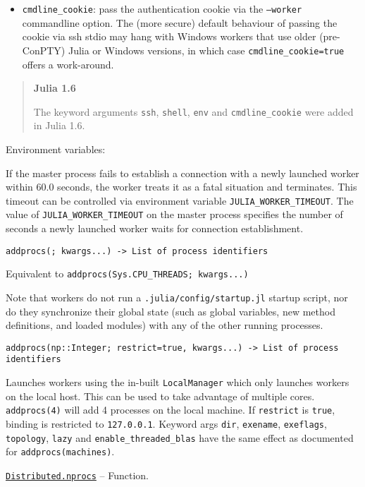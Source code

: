 \begin{adjustwidth}{2em}{0pt}
\begin{itemize}
\item \texttt{cmdline\_cookie}: pass the authentication cookie via the \texttt{--worker} commandline  option. The (more secure) default behaviour of passing the cookie via ssh stdio  may hang with Windows workers that use older (pre-ConPTY) Julia or Windows versions,  in which case \texttt{cmdline\_cookie=true} offers a work-around.

\end{itemize}
\begin{quote}
\textbf{Julia 1.6}

The keyword arguments \texttt{ssh}, \texttt{shell}, \texttt{env} and \texttt{cmdline\_cookie} were added in Julia 1.6.

\end{quote}
Environment variables:

If the master process fails to establish a connection with a newly launched worker within 60.0 seconds, the worker treats it as a fatal situation and terminates. This timeout can be controlled via environment variable \texttt{JULIA\_WORKER\_TIMEOUT}. The value of \texttt{JULIA\_WORKER\_TIMEOUT} on the master process specifies the number of seconds a newly launched worker waits for connection establishment.




\begin{lstlisting}
addprocs(; kwargs...) -> List of process identifiers
\end{lstlisting}

Equivalent to \texttt{addprocs(Sys.CPU\_THREADS; kwargs...)}

Note that workers do not run a \texttt{.julia/config/startup.jl} startup script, nor do they synchronize their global state (such as global variables, new method definitions, and loaded modules) with any of the other running processes.




\begin{lstlisting}
addprocs(np::Integer; restrict=true, kwargs...) -> List of process identifiers
\end{lstlisting}

Launches workers using the in-built \texttt{LocalManager} which only launches workers on the local host. This can be used to take advantage of multiple cores. \texttt{addprocs(4)} will add 4 processes on the local machine. If \texttt{restrict} is \texttt{true}, binding is restricted to \texttt{127.0.0.1}. Keyword args \texttt{dir}, \texttt{exename}, \texttt{exeflags}, \texttt{topology}, \texttt{lazy} and \texttt{enable\_threaded\_blas} have the same effect as documented for \texttt{addprocs(machines)}.



\end{adjustwidth}
\hypertarget{12624410612036310990}{}
\hyperlink{12624410612036310990}{\texttt{Distributed.nprocs}}  -- {Function.}

